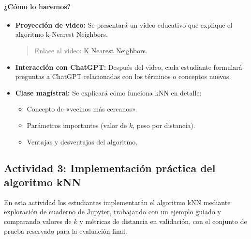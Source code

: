 \documentclass[a4,11pt]{aleph-notas}
\begin{document}
\paragraph{¿Cómo lo haremos?}  
\begin{itemize}[leftmargin=*]
    \item \textbf{Proyección de video:}  
    Se presentará un video educativo que explique el algoritmo k-Nearest Neighbors.
    \begin{quote}
        Enlace al video: \href{https://www.youtube.com/watch?v=0p0o5cmgLdE}{K Nearest Neighbors}.
    \end{quote}
    
    \item \textbf{Interacción con ChatGPT:}  
    Después del video, cada estudiante formulará preguntas a ChatGPT relacionadas con los términos o conceptos nuevos.
    
    \item \textbf{Clase magistral:} 
    Se explicará cómo funciona kNN en detalle: 
    \begin{itemize}
        \item Concepto de «vecinos más cercanos».
        \item Parámetros importantes (valor de $k$, peso por distancia).
        \item Ventajas y desventajas del algoritmo.
    \end{itemize}
   
\end{itemize}

\subsection*{Actividad 3: Implementación práctica del algoritmo kNN}

En esta actividad los estudiantes implementarán el algoritmo kNN mediante exploración de cuaderno de Jupyter, trabajando con un ejemplo guiado y comparando valores de $k$ y métricas de distancia en validación, con el conjunto de prueba reservado para la evaluación final.
\end{document}
